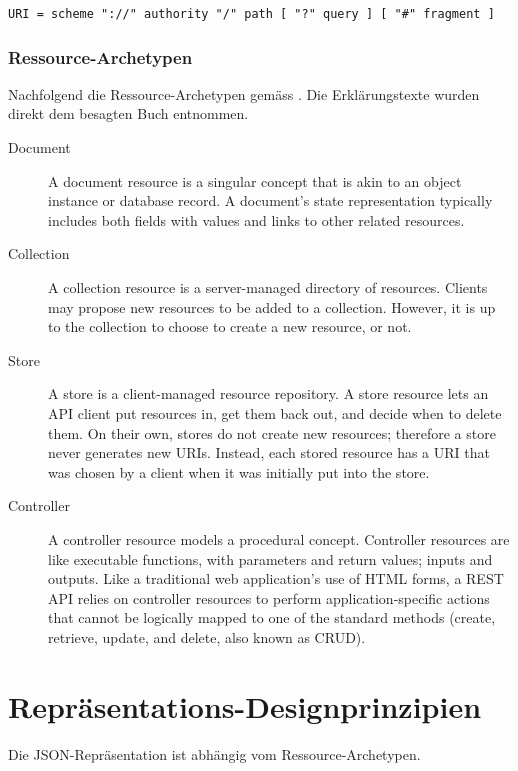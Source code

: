 \documentclass[10pt,a4paper]{scrartcl}
\let\textquotedbl="
\begin{document}
\texttt{URI = scheme \textquotedbl ://\textquotedbl{} authority \textquotedbl /\textquotedbl{}
path [ \textquotedbl ?\textquotedbl{} query ] [ \textquotedbl \#\textquotedbl{} fragment ]}

\subsubsection*{Ressource-Archetypen}

Nachfolgend die Ressource-Archetypen gemäss \cite{masse2011rest}. Die Erklärungstexte wurden direkt dem besagten
Buch entnommen.

\begin{description}
	\item[Document] A document resource is a singular concept that is akin to an object instance or database
		record. A document’s state representation typically includes both fields with values and
		links to other related resources.
	\item[Collection] A collection resource is a server-managed directory of resources. Clients may propose
		new resources to be added to a collection. However, it is up to the collection to choose
		to create a new resource, or not.
	\item[Store] A store is a client-managed resource repository. A store resource lets an API client put
		resources in, get them back out, and decide when to delete them. On their own, stores
		do not create new resources; therefore a store never generates new URIs. Instead, each
		stored resource has a URI that was chosen by a client when it was initially put into the
		store.
	\item[Controller] A controller resource models a procedural concept. Controller resources are like
		executable functions, with parameters and return values; inputs and outputs.
		Like a traditional web application’s use of HTML forms, a REST API relies on controller
		resources to perform application-specific actions that cannot be logically mapped to
		one of the standard methods (create, retrieve, update, and delete, also known as
		CRUD).
\end{description}


\section{Repräsentations-Designprinzipien}

Die JSON-Repräsentation ist abhängig vom Ressource-Archetypen.
\end{document}
